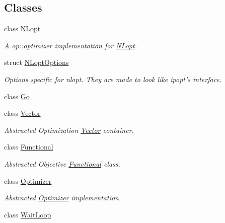 \subsection*{Classes}
\begin{DoxyCompactItemize}
\item 
class \hyperlink{classop_1_1NLopt}{N\-Lopt}
\begin{DoxyCompactList}\small\item\em A op\-::optimizer implementation for \hyperlink{classop_1_1NLopt}{N\-Lopt}. \end{DoxyCompactList}\item 
struct \hyperlink{structop_1_1NLoptOptions}{N\-Lopt\-Options}
\begin{DoxyCompactList}\small\item\em Options specific for nlopt. They are made to look like ipopt's interface. \end{DoxyCompactList}\item 
class \hyperlink{classop_1_1Go}{Go}
\item 
class \hyperlink{classop_1_1Vector}{Vector}
\begin{DoxyCompactList}\small\item\em Abstracted Optimization \hyperlink{classop_1_1Vector}{Vector} container. \end{DoxyCompactList}\item 
class \hyperlink{classop_1_1Functional}{Functional}
\begin{DoxyCompactList}\small\item\em Abstracted Objective \hyperlink{classop_1_1Functional}{Functional} class. \end{DoxyCompactList}\item 
class \hyperlink{classop_1_1Optimizer}{Optimizer}
\begin{DoxyCompactList}\small\item\em Abstracted \hyperlink{classop_1_1Optimizer}{Optimizer} implementation. \end{DoxyCompactList}\item 
class \hyperlink{classop_1_1WaitLoop}{Wait\-Loop}
\end{DoxyCompactItemize}
